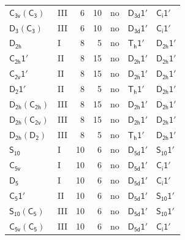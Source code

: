 \documentclass[10pt,a4paper]{article}
\numberwithin{equation}{section}
\newcommand{\grp}[1]{\mathsf{#1}}
\begin{document}
{\begin{longtable}{@{}llrrlll@{}}
\href{C3v-C3.pdf}{$\grp{C_{3v}}(\grp{C_{3}})$} & III & 6 & 10 & no & \href{D3d-1p.pdf}{$\grp{D_{3d}1'}$} & \href{S2-1p.pdf}{$\grp{C_{i}1'}$}\\
\href{D3-C3.pdf}{$\grp{D_{3}}(\grp{C_{3}})$} & III & 6 & 10 & no & \href{D3d-1p.pdf}{$\grp{D_{3d}1'}$} & \href{S2-1p.pdf}{$\grp{C_{i}1'}$}\\
\href{../../../rotation/data/pdf/D2h.pdf}{$\grp{D_{2h}}$} & I & 8 & 5 & no & \href{Th-1p.pdf}{$\grp{T_{h}1'}$} & \href{D2h-1p.pdf}{$\grp{D_{2h}1'}$}\\
\href{C2h-1p.pdf}{$\grp{C_{2h}1'}$} & II & 8 & 15 & no & \href{D2h-1p.pdf}{$\grp{D_{2h}1'}$} & \href{D2h-1p.pdf}{$\grp{D_{2h}1'}$}\\
\href{C2v-1p.pdf}{$\grp{C_{2v}1'}$} & II & 8 & 15 & no & \href{D2h-1p.pdf}{$\grp{D_{2h}1'}$} & \href{D2h-1p.pdf}{$\grp{D_{2h}1'}$}\\
\href{D2-1p.pdf}{$\grp{D_{2}1'}$} & II & 8 & 5 & no & \href{Th-1p.pdf}{$\grp{T_{h}1'}$} & \href{D2h-1p.pdf}{$\grp{D_{2h}1'}$}\\
\href{D2h-C2h.pdf}{$\grp{D_{2h}}(\grp{C_{2h}})$} & III & 8 & 15 & no & \href{D2h-1p.pdf}{$\grp{D_{2h}1'}$} & \href{D2h-1p.pdf}{$\grp{D_{2h}1'}$}\\
\href{D2h-C2v.pdf}{$\grp{D_{2h}}(\grp{C_{2v}})$} & III & 8 & 15 & no & \href{D2h-1p.pdf}{$\grp{D_{2h}1'}$} & \href{D2h-1p.pdf}{$\grp{D_{2h}1'}$}\\
\href{D2h-D2.pdf}{$\grp{D_{2h}}(\grp{D_{2}})$} & III & 8 & 5 & no & \href{Th-1p.pdf}{$\grp{T_{h}1'}$} & \href{D2h-1p.pdf}{$\grp{D_{2h}1'}$}\\
\href{../../../rotation/data/pdf/S10.pdf}{$\grp{S_{10}}$} & I & 10 & 6 & no & \href{D5d-1p.pdf}{$\grp{D_{5d}1'}$} & \href{S10-1p.pdf}{$\grp{S_{10}1'}$}\\
\href{../../../rotation/data/pdf/C5v.pdf}{$\grp{C_{5v}}$} & I & 10 & 6 & no & \href{D5d-1p.pdf}{$\grp{D_{5d}1'}$} & \href{S2-1p.pdf}{$\grp{C_{i}1'}$}\\
\href{../../../rotation/data/pdf/D5.pdf}{$\grp{D_{5}}$} & I & 10 & 6 & no & \href{D5d-1p.pdf}{$\grp{D_{5d}1'}$} & \href{S2-1p.pdf}{$\grp{C_{i}1'}$}\\
\href{C5-1p.pdf}{$\grp{C_{5}1'}$} & II & 10 & 6 & no & \href{D5d-1p.pdf}{$\grp{D_{5d}1'}$} & \href{S10-1p.pdf}{$\grp{S_{10}1'}$}\\
\href{S10-C5.pdf}{$\grp{S_{10}}(\grp{C_{5}})$} & III & 10 & 6 & no & \href{D5d-1p.pdf}{$\grp{D_{5d}1'}$} & \href{S10-1p.pdf}{$\grp{S_{10}1'}$}\\
\href{C5v-C5.pdf}{$\grp{C_{5v}}(\grp{C_{5}})$} & III & 10 & 6 & no & \href{D5d-1p.pdf}{$\grp{D_{5d}1'}$} & \href{S2-1p.pdf}{$\grp{C_{i}1'}$}\\

\end{longtable}}
\end{document}

